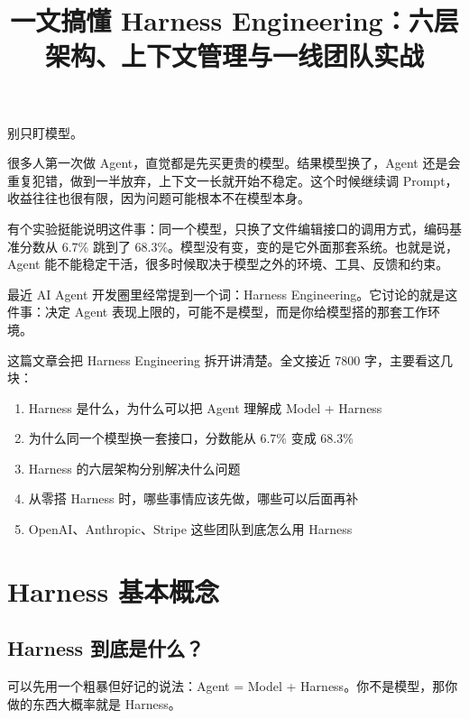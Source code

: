 \documentclass[10pt,a4paper]{ctexart}
\begin{document}
\title{一文搞懂 Harness Engineering：六层架构、上下文管理与一线团队实战}
\date{}
\maketitle

别只盯模型。



很多人第一次做 Agent，直觉都是先买更贵的模型。结果模型换了，Agent 还是会重复犯错，做到一半放弃，上下文一长就开始不稳定。这个时候继续调 Prompt，收益往往也很有限，因为问题可能根本不在模型本身。



有个实验挺能说明这件事：同一个模型，只换了文件编辑接口的调用方式，编码基准分数从 6.7\% 跳到了 68.3\%。模型没有变，变的是它外面那套系统。也就是说，Agent 能不能稳定干活，很多时候取决于模型之外的环境、工具、反馈和约束。



最近 AI Agent 开发圈里经常提到一个词：Harness Engineering。它讨论的就是这件事：决定 Agent 表现上限的，可能不是模型，而是你给模型搭的那套工作环境。



这篇文章会把 Harness Engineering 拆开讲清楚。全文接近 7800 字，主要看这几块：


\begin{enumerate}[itemsep=2pt, topsep=4pt]
  \item Harness 是什么，为什么可以把 Agent 理解成 Model + Harness
  \item 为什么同一个模型换一套接口，分数能从 6.7\% 变成 68.3\%
  \item Harness 的六层架构分别解决什么问题
  \item 从零搭 Harness 时，哪些事情应该先做，哪些可以后面再补
  \item OpenAI、Anthropic、Stripe 这些团队到底怎么用 Harness
\end{enumerate}


\section{Harness 基本概念}


\subsection{Harness 到底是什么？}


可以先用一个粗暴但好记的说法：Agent = Model + Harness。你不是模型，那你做的东西大概率就是 Harness。
\end{document}
